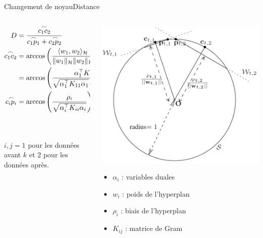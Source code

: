 \begin{frame}{Changement de noyau}{Distance}

\begin{columns}
\begin{column}{.47\textwidth}
\small
\begin{align}
  D &= \frac{\overset{\frown}{c_1 c_2}}{\overset{\frown}{c_1 p_1} + \overset{\frown}{c_2 p_2}} \notag \\
  \overset{\frown}{c_1 c_2} &= \arccos\left(\frac{
    	\langle w_1, w_2\rangle_\mathcal{H}
    	}{
    	\|w_1\|_\mathcal{H}\|w_2\|_\mathcal{H}
    	} \right) \notag \\
   &= \arccos\left(\frac{
  	\alpha_1^\top K_{12} \alpha_2
  	}{
  	\sqrt{\alpha_1^\top K_{11} \alpha_1} \sqrt{\alpha_2^\top K_{22} \alpha_2}
  	} \right) \notag \\
  \overset{\frown}{c_i p_i} &= \arccos\left( \frac{\rho_i}{\sqrt{\alpha_i^\top K_{ii} \alpha_i}}  \right) \notag
\end{align}

~\\~\\
$i, j = 1$ pour les données avant $k$ et $2$ pour les données après.

\end{column}
\begin{column}{.47\textwidth}

\includegraphics[width=\textwidth]{images/svm}


\begin{itemize}
\item $\alpha_i$ : variables duales
\item $w_i$ : poids de l'hyperplan
\item $\rho_i$ : biais de l'hyperplan
\item $K_{ij}$ : matrice de Gram
\end{itemize}

\end{column}
\end{columns}

\end{frame}

